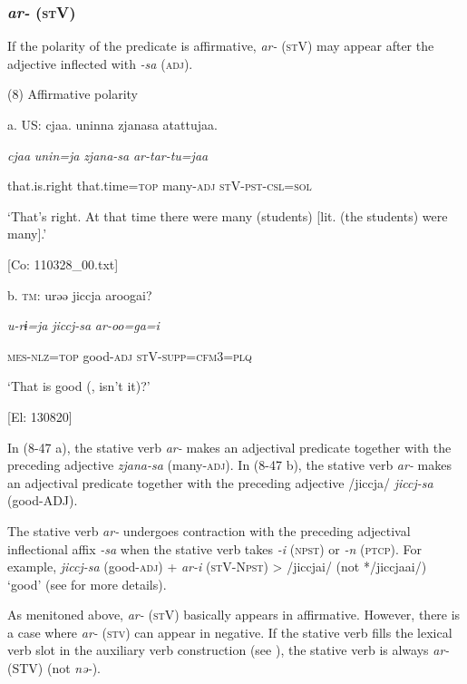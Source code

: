 \subsubsection{\textit{ar-} (\textsc{st}V)}

If the polarity of the predicate is affirmative, \textit{ar-} (\textsc{st}V) may appear after the adjective inflected with \textit{{}-sa} (\textsc{adj}).

(8)  Affirmative polarity

  a.  US:  cjaa.  uninna  zjanasa  atattujaa.

      \textit{cjaa}  \textit{unin=ja}  \textit{zjana-sa}  \textit{ar{}-tar-tu=jaa}

      that.is.right  that.time=\textsc{top}  many-\textsc{adj}  \textsc{st}V-\textsc{pst}-\textsc{csl}=\textsc{sol}

      ‘That’s right. At that time there were many (students) [lit. (the students) were many].’

      [Co: 110328\_00.txt]

  b.  \textsc{tm}:  urəə  jiccja  aroogai?

      \textit{u-rɨ=ja}  \textit{jiccj-sa}  \textit{ar{}-oo=ga=i}

      \textsc{mes}-\textsc{nlz}=\textsc{top}  good-\textsc{adj}  \textsc{st}V-\textsc{supp}=\textsc{cfm}3=\textsc{plq}

      ‘That is good (, isn’t it)?’

      [El: 130820]

In (8-47 a), the stative verb \textit{ar-} makes an adjectival predicate together with the preceding adjective \textit{zjana-sa} (many-\textsc{adj}). In (8-47 b), the stative verb \textit{ar-} makes an adjectival predicate together with the preceding adjective /jiccja/ \textit{jiccj-sa} (good-ADJ).

  The stative verb \textit{ar-} undergoes contraction with the preceding adjectival inflectional affix \textit{{}-sa} when the stative verb takes \textit{{}-i} (\textsc{npst}) or \textit{{}-n} (\textsc{ptcp}). For example, \textit{jiccj-sa} (good-\textsc{adj}) + \textit{ar-i} (\textsc{st}V-N\textsc{pst}) > /jiccjai/ (not */jiccjaai/) ‘good’ (see  for more details).

As menitoned above, \textit{ar-} (\textsc{st}V) basically appears in affirmative. However, there is a case where \textit{ar-} (\textsc{stv}) can appear in negative. If the stative verb fills the lexical verb slot in the auxiliary verb construction (see ), the stative verb is always \textit{ar-} (STV) (not \textit{nə-}).

